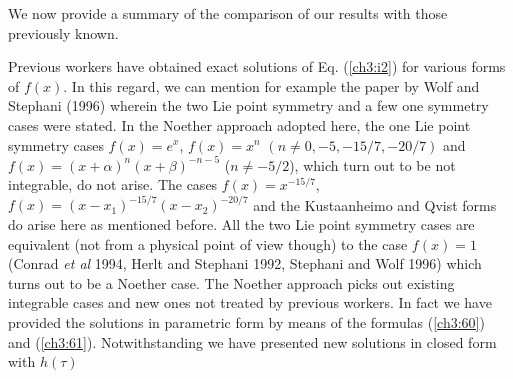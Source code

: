 We now provide a summary of the comparison of our results with those previously known.

Previous workers have obtained exact solutions of Eq. (\ref{ch3:i2}) for various 
forms of $f(x)$. In this regard, we can mention for example the paper
by Wolf and Stephani (1996) wherein the two Lie point symmetry and a few
one symmetry cases were stated. In the Noether approach adopted here,
the one Lie point symmetry cases $f(x) =e^x$, $f(x)=x^n$ $(n\ne0,-5,-15/7,-20/7)$ and $f(x)=(x+\alpha)^n
(x+\beta)^{-n-5}$ ($n\ne-5/2$), which turn out to be not integrable,
do not arise. The cases $f(x)=x^{-15/7}$, $f(x)=(x-x_1)^{-15/7}(x-x_2)^{-20/7}$ and the 
Kustaanheimo and Qvist forms do arise here as mentioned before. 
All the two Lie point symmetry cases are equivalent (not
from a physical point of view though) to the case $f(x)=1$
(Conrad {\em et al } 1994, Herlt and Stephani 1992, Stephani and Wolf 1996)
which turns out to be a  Noether
case. The Noether 
approach picks out  existing integrable cases and new ones not treated by
previous workers. In fact we have provided the solutions in parametric form by means of the formulas
(\ref{ch3:60}) and (\ref{ch3:61}). Notwithstanding we have presented new solutions in closed form with $h(\tau)$
